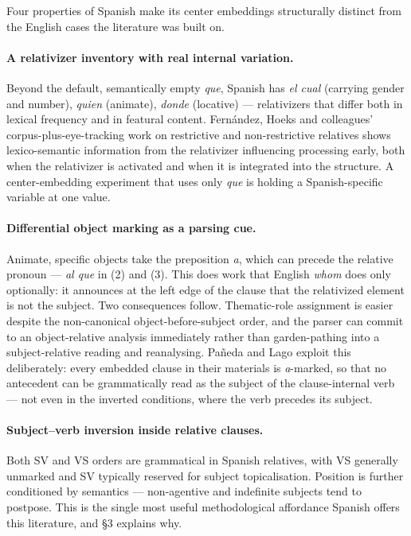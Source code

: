 \documentclass[11pt, a4paper]{article}
\begin{document}
\vspace{0.6em}
Four properties of Spanish make its center embeddings structurally distinct from the English cases the literature was built on.

\paragraph{A relativizer inventory with real internal variation.} Beyond the default, semantically empty \emph{que}, Spanish has \emph{el cual} (carrying gender and number), \emph{quien} (animate), \emph{donde} (locative) --- relativizers that differ both in lexical frequency and in featural content. Fernández, Hoeks and colleagues' corpus-plus-eye-tracking work on restrictive and non-restrictive relatives shows lexico-semantic information from the relativizer influencing processing early, both when the relativizer is activated and when it is integrated into the structure. A center-embedding experiment that uses only \emph{que} is holding a Spanish-specific variable at one value.

\paragraph{Differential object marking as a parsing cue.} Animate, specific objects take the preposition \emph{a}, which can precede the relative pronoun --- \emph{al que} in (2) and (3). This does work that English \emph{whom} does only optionally: it announces at the left edge of the clause that the relativized element is not the subject. Two consequences follow. Thematic-role assignment is easier despite the non-canonical object-before-subject order, and the parser can commit to an object-relative analysis immediately rather than garden-pathing into a subject-relative reading and reanalysing. Pañeda and Lago exploit this deliberately: every embedded clause in their materials is \emph{a}-marked, so that no antecedent can be grammatically read as the subject of the clause-internal verb --- not even in the inverted conditions, where the verb precedes its subject.

\paragraph{Subject--verb inversion inside relative clauses.} Both SV and VS orders are grammatical in Spanish relatives, with VS generally unmarked and SV typically reserved for subject topicalisation. Position is further conditioned by semantics --- non-agentive and indefinite subjects tend to postpose. This is the single most useful methodological affordance Spanish offers this literature, and \S3 explains why.
\end{document}
